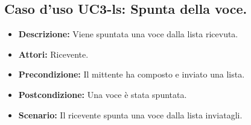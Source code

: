 \subsection{Caso d'uso UC3-ls: Spunta della voce.}
\begin{itemize}
\item[]\textbf{Descrizione:} Viene spuntata una voce dalla lista ricevuta.
\item[]\textbf{Attori:} Ricevente. 
\item[]\textbf{Precondizione:} Il mittente ha composto e inviato una lista. 
\item[]\textbf{Postcondizione:} Una voce è stata spuntata. 
\item[]\textbf{Scenario:}
Il ricevente spunta una voce dalla lista inviatagli. 
\end{itemize}

\clearpage

